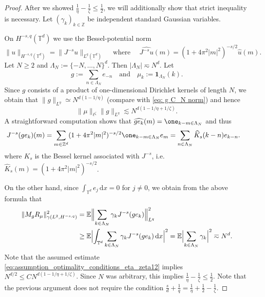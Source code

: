 \documentclass[reqno]{amsart}
\theoremstyle{plain}
\theoremstyle{remark}
\theoremstyle{plain}
\numberwithin{equation}{section}
\newcommand\bZ{\mathbb{Z}}
\def\Z{{\mathbb Z}}
\newcommand{\T}{\mathbb{T}}
\newcommand{\di}{\mathrm{d}}
\newcommand{\1}{\one}
\begin{document}
\begin{proof}
After we showed $\frac1\eta-\frac1\zeta\leq \frac12$, we will additionally show that strict inequality is necessary. Let $(\gamma_k)_{k\in \Z}$ be independent standard Gaussian variables.

On $H^{-s,q}(\mathbb T^d)$ we use the Bessel-potential norm
\[
        \|u\|_{H^{-s,q}(\mathbb T^d)}
        =
        \|J^{-s}u\|_{L^q(\mathbb T^d)}
        \quad \text{ where }\quad
        \widehat{J^{-s}u}(m)
        =
        (1+4\pi^2|m|^2)^{-s/2}\widehat u(m).
\]
Let $N\geq 2$ and $\Lambda_N:=\{-N,\ldots,N\}^d$. Then $|\Lambda_N| \eqsim N^{d}$. Let 
\[
        g:=\sum_{n\in \Lambda_N}e_{-n} \quad \text{and} \quad \mu_k:=\mathbf 1_{\Lambda_N}(k). 
\]
Since $g$ consists of a product of one-dimensional Dirichlet kernels of length $N$, we obtain that $\|g\|_{L^\eta}\simeq N^{d(1-1/\eta)}$ (compare with \eqref{eq: g C_N norm}) and hence
\[\|\mu\|_{\ell^\zeta}\|g\|_{L^\eta} \lesssim N^{d(1-1/\eta + 1/\zeta)}.\]
A straightforward computation shows that
$\widehat{ge_k}(m) = \1_{k-m \in\Lambda_N}$
and thus
\begin{align}
\label{eq: J^s computation}
    J^{-s}(ge_k)(m) &= \sum_{m\in\bZ^d}(1+4\pi^2|m|^2)^{-s/2}\1_{k-m \in\Lambda_N}e_m
    = \sum_{n\in\Lambda_N}\widehat{K}_s(k-n) e_{k-n}.
\end{align}
where $K_s$ is the Bessel kernel associated with $J^{-s}$, i.e. $\widehat{K}_s(m)=(1+4\pi^2|m|^2)^{-s/2}$.


On the other hand, since $\int_{\T^d} e_j \, \di x=0$ for $j\neq 0$, we obtain from the above formula that
\begin{align*}
        \|M_{g}R_{\mu}\|_{\gamma(L^2,H^{-s,q})}^2
        &=
        \mathbb E
        \Bigl\|
            \sum_{k\in \Lambda_N}\gamma_k J^{-s}(ge_k)
        \Bigr\|_{L^q}^2
\\ & \geq    \mathbb E
        \Bigl|\int_{\mathbb{T}^d}
            \sum_{k\in \Lambda_N}\gamma_k J^{-s}(ge_k)\, \di x\Bigr|^2
= \mathbb E
        \Bigl|
            \sum_{k\in \Lambda_N}\gamma_k 
        \Bigr |^2 \eqsim N^{d}.
\end{align*}
Note that the assumed estimate \eqref{eq:assumption_optimality_conditions_eta_zeta12} implies $N^{d/2}\leq C N^{d(1-1/\eta + 1/\zeta)}$. Since $N$ was arbitrary, this implies $\frac1\eta-\frac1\zeta\leq \frac12$. Note that the previous argument does not require the condition $\frac{s}{d} + \frac{1}{q}  = \frac{1}{\eta} + \frac{1}{2} - \frac{1}{\zeta}$.



\end{proof}
\end{document}
